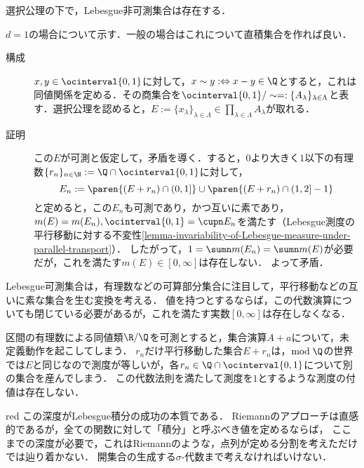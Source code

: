 \documentclass[uplatex, dvipdfmx]{jsreport}
\begin{document}
\begin{theorem}[Lebesgue非可測集合]\label{thm-existence-of-unmeasurable-sets}
    選択公理の下で，Lebesgue非可測集合は存在する．
\end{theorem}
\begin{Proof}
    $d=1$の場合について示す．一般の場合はこれについて直積集合を作れば良い．
    \begin{description}
        \item[構成] 
        $x,y\in\ocinterval{0,1}$に対して，$x\sim y:\Leftrightarrow x-y\in\Q$とすると，これは同値関係を定める．その商集合を$\ocinterval{0,1}/\sim=:\{A_\lambda\}_{\lambda\in\Lambda}$と表す．選択公理を認めると，$E:=\{x_\lambda\}_{\lambda\in\Lambda}\in\prod_{\lambda\in\Lambda}A_\lambda$が取れる．
        \item[証明]
        この$E$が可測と仮定して，矛盾を導く．すると，$0$より大きく$1$以下の有理数$\{r_n\}_{n\in\N}:=\Q\cap\ocinterval{0,1}$に対して，
        \[E_n:=\paren{(E+r_n)\cap(0,1]}\cup\paren{(E+r_n)\cap(1,2]-1}\]
        と定めると，この$E_n$も可測であり，かつ互いに素であり，$m(E)=m(E_n),\ocinterval{0,1}=\cupn E_n$を満たす（Lebesgue測度の平行移動に対する不変性\ref{lemma-invariability-of-Lebesgue-measure-under-parallel-transport}）．
        したがって，$1=\sumn m(E_n)=\sumn m(E)$が必要だが，これを満たす$m(E)\in[0,\infty]$は存在しない．
        よって矛盾．
    \end{description}
\end{Proof}
\begin{remarks}
    Lebesgue可測集合は，有理数などの可算部分集合に注目して，平行移動などの互いに素な集合を生む変換を考える．
        値を持つとするならば，この代数演算についても閉じている必要があるが，これを満たす実数$[0,\infty]$は存在しなくなる．

    区間の有理数による同値類$\R/\Q$を可測とすると，集合演算$A+a$について，未定義動作を起こしてしまう．
    $r_n$だけ平行移動した集合$E+r_n$は，$\mathrm{mod}\;\Q$の世界では$E$と同じなので測度が等しいが，各$r_n\in\Q\cap\ocinterval{0,1}$について別の集合を産んでしまう．
    この代数法則を満たして測度を$1$とするような測度の付値は存在しない．
\end{remarks}

\begin{tbox}{red}{}
    この深度がLebesgue積分の成功の本質である．
    Riemannのアプローチは直感的であるが，全ての関数に対して「積分」と呼ぶべき値を定めるならば，
    ここまでの深度が必要で，これはRiemannのような，点列が定める分割を考えただけでは辿り着かない．
    開集合の生成する$\sigma$-代数まで考えなければいけない．
\end{tbox}
\end{document}
